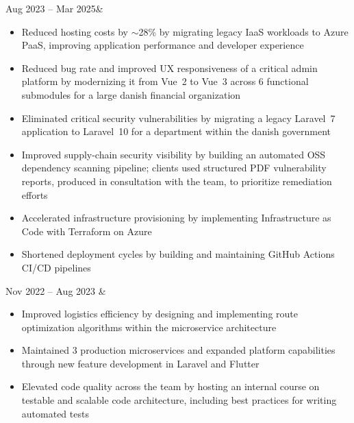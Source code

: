 \documentclass[a4paper]{report}
\begin{document}
\begin{longtabu}
    Aug 2023 -- Mar 2025& 
    \vspace{-1em}
    \begin{itemize}[leftmargin=2em, topsep=-.5em, parsep=0em]
        \item Reduced hosting costs by $\sim$28\% by migrating legacy IaaS workloads to Azure PaaS, improving application performance and developer experience
        \item Reduced bug rate and improved UX responsiveness of a critical admin platform by modernizing it from Vue~2 to Vue~3 across 6 functional submodules for a large danish financial organization
        \item Eliminated critical security vulnerabilities by migrating a legacy Laravel~7 application to Laravel~10 for a department within the danish government
        \item Improved supply-chain security visibility by building an automated OSS dependency scanning pipeline; clients used structured PDF vulnerability reports, produced in consultation with the team, to prioritize remediation efforts
        \item Accelerated infrastructure provisioning by implementing Infrastructure as Code with Terraform on Azure
        \item Shortened deployment cycles by building and maintaining GitHub Actions CI/CD pipelines
    \end{itemize}
    \n

    Nov 2022 -- Aug 2023 & 
    \vspace{-1em}
    \begin{itemize}[leftmargin=2em, topsep=-.5em, parsep=0em]
        \item Improved logistics efficiency by designing and implementing route optimization algorithms within the microservice architecture
        \item Maintained 3 production microservices and expanded platform capabilities through new feature development in Laravel and Flutter
        \item Elevated code quality across the team by hosting an internal course on testable and scalable code architecture, including best practices for writing automated tests
    \end{itemize}
    \n


\end{longtabu}
\end{document}
